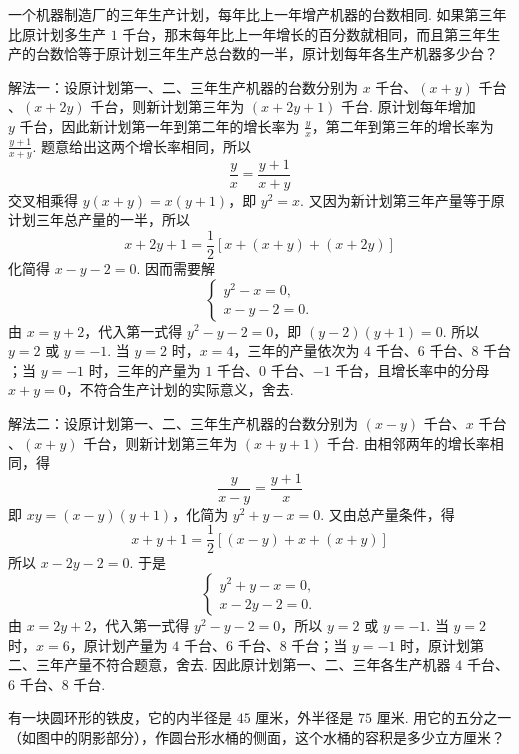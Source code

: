 \documentclass[UTF8,a4paper,oneside,11pt]{ctexbook}
\begin{document}
\begin{problem}
一个机器制造厂的三年生产计划，每年比上一年增产机器的台数相同. 如果第三年比原计划多生产 \(1\text{ 千台}\)，那末每年比上一年增长的百分数就相同，而且第三年生产的台数恰等于原计划三年生产总台数的一半，原计划每年各生产机器多少台？
\end{problem}

\begin{solution}
解法一：设原计划第一、二、三年生产机器的台数分别为 \(x\text{ 千台}\)、\((x+y)\text{ 千台}\)、\((x+2y)\text{ 千台}\)，则新计划第三年为 \((x+2y+1)\text{ 千台}\). 原计划每年增加 \(y\text{ 千台}\)，因此新计划第一年到第二年的增长率为 \(\frac{y}{x}\)，第二年到第三年的增长率为 \(\frac{y+1}{x+y}\). 题意给出这两个增长率相同，所以
\[
\frac{y}{x}=\frac{y+1}{x+y}
\]
交叉相乘得 \(y(x+y)=x(y+1)\)，即 \(y^2=x\). 又因为新计划第三年产量等于原计划三年总产量的一半，所以
\[
x+2y+1=\frac{1}{2}\left[x+(x+y)+(x+2y)\right]
\]
化简得 \(x-y-2=0\). 因而需要解
\[
\begin{cases}
y^2-x=0,\\
x-y-2=0.
\end{cases}
\]
由 \(x=y+2\)，代入第一式得 \(y^2-y-2=0\)，即 \((y-2)(y+1)=0\). 所以 \(y=2\) 或 \(y=-1\). 当 \(y=2\) 时，\(x=4\)，三年的产量依次为 \(4\text{ 千台}\)、\(6\text{ 千台}\)、\(8\text{ 千台}\)；当 \(y=-1\) 时，三年的产量为 \(1\text{ 千台}\)、\(0\text{ 千台}\)、\(-1\text{ 千台}\)，且增长率中的分母 \(x+y=0\)，不符合生产计划的实际意义，舍去.

解法二：设原计划第一、二、三年生产机器的台数分别为 \((x-y)\text{ 千台}\)、\(x\text{ 千台}\)、\((x+y)\text{ 千台}\)，则新计划第三年为 \((x+y+1)\text{ 千台}\). 由相邻两年的增长率相同，得
\[
\frac{y}{x-y}=\frac{y+1}{x}
\]
即 \(xy=(x-y)(y+1)\)，化简为 \(y^2+y-x=0\). 又由总产量条件，得
\[
x+y+1=\frac{1}{2}\left[(x-y)+x+(x+y)\right]
\]
所以 \(x-2y-2=0\). 于是
\[
\begin{cases}
y^2+y-x=0,\\
x-2y-2=0.
\end{cases}
\]
由 \(x=2y+2\)，代入第一式得 \(y^2-y-2=0\)，所以 \(y=2\) 或 \(y=-1\). 当 \(y=2\) 时，\(x=6\)，原计划产量为 \(4\text{ 千台}\)、\(6\text{ 千台}\)、\(8\text{ 千台}\)；当 \(y=-1\) 时，原计划第二、三年产量不符合题意，舍去. 因此原计划第一、二、三年各生产机器 \(4\text{ 千台}\)、\(6\text{ 千台}\)、\(8\text{ 千台}\).
\end{solution}

\begin{problem}
有一块圆环形的铁皮，它的内半径是 \(45\text{ 厘米}\)，外半径是 \(75\text{ 厘米}\). 用它的五分之一（如图中的阴影部分），作圆台形水桶的侧面，这个水桶的容积是多少立方厘米？

\end{problem}
\end{document}
